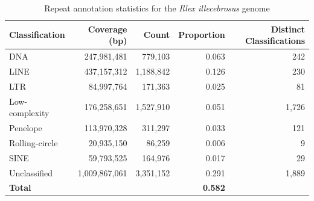 \documentclass[12pt]{article}
\begin{document}
\begin{table}[H]
\centering
\caption{Repeat annotation statistics for the \textit{Illex illecebrosus} genome}
\label{tab:repeat_stats}
\begin{tabular}{lrrrr}
\toprule
\textbf{Classification} & \textbf{Coverage (bp)} & \textbf{Count} & \textbf{Proportion} & \textbf{Distinct Classifications} \\
\midrule
DNA & 247,981,481 & 779,103 & 0.063 & 242 \\
LINE & 437,157,312 & 1,188,842 & 0.126 & 230 \\
LTR & 84,997,764 & 171,363 & 0.025 & 81 \\
Low-complexity & 176,258,651 & 1,527,910 & 0.051 & 1,726 \\
Penelope & 113,970,328 & 311,297 & 0.033 & 121 \\
Rolling-circle & 20,935,150 & 86,259 & 0.006 & 9 \\
SINE & 59,793,525 & 164,976 & 0.017 & 29 \\
Unclassified & 1,009,867,061 & 3,351,152 & 0.291 & 1,889 \\
\midrule
\textbf{Total} & & & \textbf{0.582} & \\
\bottomrule
\end{tabular}
\end{table}
\end{document}
